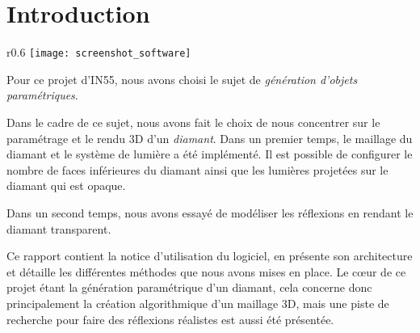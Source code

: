 \section{Introduction}

\begin{wrapfigure}{r}{0.6\textwidth}
    \centering
    \texttt{[image: screenshot\_software]}
\end{wrapfigure}

Pour ce projet d'IN55, nous avons choisi le sujet de \emph{génération
d'objets paramétriques}.

Dans le cadre de ce sujet, nous avons fait le choix de nous concentrer sur le paramétrage
et le rendu 3D d'un \emph{diamant}.
Dans un premier temps, le maillage du diamant et le système de lumière a été implémenté.
Il est possible de configurer le nombre de faces inférieures du diamant ainsi que
les lumières projetées sur le diamant qui est opaque.

Dans un second temps, nous avons essayé de modéliser les réflexions en rendant le diamant
transparent.

Ce rapport contient la notice d'utilisation du logiciel, en présente son architecture
et détaille les différentes méthodes que nous avons mises en place.
Le cœur de ce projet étant la génération paramétrique d'un diamant, cela concerne
donc principalement la création algorithmique d'un maillage 3D, mais une piste de
recherche pour faire des réflexions réalistes est aussi été présentée.

